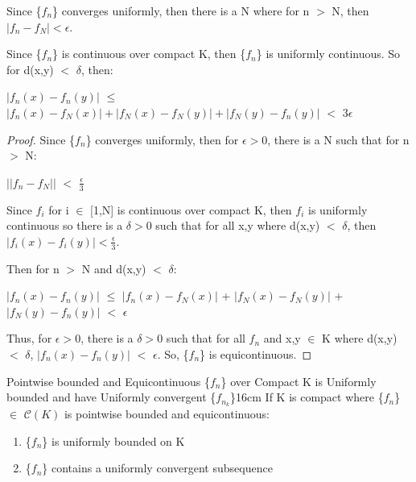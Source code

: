     \begin{intuition}
        Since \{$f_n$\} converges uniformly, then there is a N where for n $>$ N,
        then $|f_n - f_N| < \epsilon$.

        Since \{$f_n$\} is continuous over compact K, then
        \{$f_n$\} is uniformly continuous. So for d(x,y) $<$ $\delta$, then:

        \hspace{0.5cm}
        $|f_n(x) - f_n(y)|$
        $\leq$ $|f_n(x) - f_N(x)| + |f_N(x) - f_N(y)| + |f_N(y) - f_n(y)|$
        $<$ $3\epsilon$
    \end{intuition}

    \vspace{0.1cm}

    \begin{proof}
        Since \{$f_n$\} converges uniformly, then for $\epsilon > 0$, there is a
        N such that for n $>$ N:

        \hspace{0.5cm}
        $||f_n - f_N||$ $<$ $\frac{\epsilon}{3}$

        Since $f_i$ for i $\in$ [1,N] is continuous over compact K, then
        $f_i$ is uniformly continuous so there is a $\delta > 0$ such that for
        all x,y where d(x,y) $<$ $\delta$, then
        $|f_i(x) - f_i(y)| < \frac{\epsilon}{3}$.

        Then for n $>$ N and d(x,y) $<$ $\delta$:

        \hspace{0.5cm}
        $|f_n(x) - f_n(y)|$
        $\leq$ $|f_n(x) - f_N(x)|$ + $|f_N(x) - f_N(y)|$ + $|f_N(y) - f_n(y)|$
        $<$ $\epsilon$

        Thus, for $\epsilon > 0$, there is a $\delta > 0$ such that for all $f_n$
        and x,y $\in$ K where d(x,y) $<$ $\delta$,
        $|f_n(x) - f_n(y)|$ $<$ $\epsilon$.
        So, \{$f_n$\} is equicontinuous.
    \end{proof}

    \vspace{0.5cm}



    \begin{wtheorem}{Pointwise bounded and Equicontinuous \{$f_n$\} over Compact K
    is Uniformly bounded and have Uniformly convergent \{$f_{n_k}$\}}{16cm}
        If K is compact where \{$f_n$\} $\in$ $\mathscr{C}(K)$ is pointwise bounded
        and equicontinuous:

        \begin{enumerate}[label=(\alph*), leftmargin=1.5cm, itemsep=0.1cm]
            \item \{$f_n$\} is uniformly bounded on K
            
            \item \{$f_n$\} contains a uniformly convergent subsequence
        \end{enumerate}
    \end{wtheorem}

